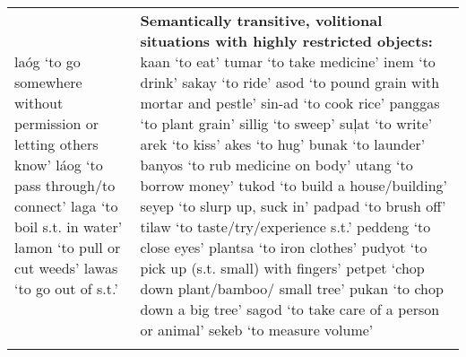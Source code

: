 \begin{table}
\begin{tabular} {
        >{\RaggedRight\arraybackslash}p{5.6cm}
        >{\RaggedRight\arraybackslash}p{5.6cm}
                    }
laóg ‘to go somewhere without permission or letting others know’\newline 
láog ‘to pass through/to connect’\newline 
laga ‘to boil s.t. in water’\newline
lamon ‘to pull  or cut weeds’\newline 
lawas ‘to go out of s.t.’%
&
{\bfseries Semantically transitive, volitional situations with highly restricted objects:}\newline
kaan ‘to eat’\newline 
tumar ‘to take medicine’\newline
inem ‘to drink’\newline 
sakay ‘to ride’\newline 
asod ‘to pound grain with mortar and pestle’\newline 
sin-ad ‘to cook rice’\newline 
panggas ‘to plant grain’\newline 
sillig ‘to sweep’\newline 
suļat ‘to write’\newline
arek ‘to kiss’\newline 
akes ‘to hug’\newline 
bunak ‘to launder’\newline 
banyos ‘to rub medicine on body’\newline 
utang ‘to borrow money’\newline 
tukod ‘to build a house/building’\newline 
seyep ‘to slurp up, suck in’\newline 
padpad ‘to brush off’\newline 
tilaw ‘to taste/try/experience s.t.’\newline 
peddeng ‘to close eyes’\newline 
plantsa ‘to iron clothes’\newline 
pudyot ‘to pick up (s.t. small) with fingers’\newline 
petpet ‘chop down plant/bamboo/ small tree’\newline 
pukan ‘to chop down a big tree’\newline 
sagod ‘to take care of a person or animal’\newline
sekeb ‘to measure volume’\\ %
\lspbottomrule
\end{tabular}
\end{table}

